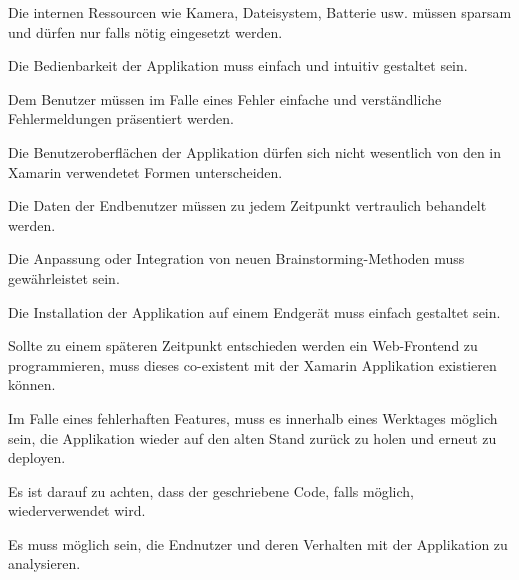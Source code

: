 \begin{description}[leftmargin=!,labelwidth=\widthof{\bfseries Wiederherstellbarkeit}]
	\item[Ressourcennutzung] Die internen Ressourcen wie Kamera, Dateisystem, Batterie usw. müssen sparsam und dürfen nur falls nötig eingesetzt werden.
	\item[Bedienbarkeit] Die Bedienbarkeit der Applikation muss einfach und intuitiv gestaltet sein.
	\item[Fehlervermeidung] Dem Benutzer müssen im Falle eines Fehler einfache und verständliche Fehlermeldungen präsentiert werden.
	\item[Ästhetik] Die Benutzeroberflächen der Applikation dürfen sich nicht wesentlich von den in Xamarin verwendetet Formen unterscheiden.
	\item[Vertraulichkeit] Die Daten der Endbenutzer müssen zu jedem Zeitpunkt vertraulich behandelt werden.
	\item[Anpassbarkeit] Die Anpassung oder Integration von neuen Brainstorming-Methoden muss gewährleistet sein.
	\item[Installierbarkeit] Die Installation der Applikation auf einem Endgerät muss einfach gestaltet sein.
	\item[Co-Existenz] Sollte zu einem späteren Zeitpunkt entschieden werden ein Web-Frontend zu programmieren, muss dieses co-existent mit der Xamarin Applikation existieren können.
	\item[Wiederherstellbarkeit] Im Falle eines fehlerhaften Features, muss es innerhalb eines Werktages möglich sein, die Applikation wieder auf den alten Stand zurück zu holen und erneut zu deployen.	
	\item[Wiederverwendbarkeit] Es ist darauf zu achten, dass der geschriebene Code, falls möglich, wiederverwendet wird.
	\item[Analysierbarkeit] Es muss möglich sein, die Endnutzer und deren Verhalten mit der Applikation zu analysieren.	
\end{description}
